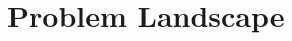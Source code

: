 \section{Problem Landscape}\label{sec:land}
\begin{comment}
We first consider the question of choosing a \emph{universal} constant step-size which is defined as follows:
\begin{definition} Let $\P$ be a problem class and $P\in\P$ be an instance, then define $\alpha^{stab}_{P}\subset (0,\infty)$ to be such that the random matrix product $\Pi_{s=1}^t (I-\alpha A_s)\ra 0$ (note $(b_t,A_t)\overset{i.i.d}{\sim} P$ ) as $t\ra\infty$ whenever $\alpha\in \alpha^{stab}_P$ and $\alpha^{stab}_{\P}\eqdef\cap_{P\in \P}\alpha_{P}$. Define any $\alpha\in\alpha_{\P}$ to be a \emph{universal} step-size choice for $\P$.
\end{definition}
Note that from \Cref{lem:hur} we have $(0,\alpha_{P_U})\subset \alpha^{stab}_{P}$. 


\end{comment}
